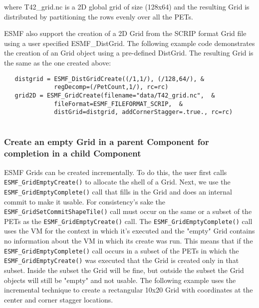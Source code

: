 
    where T42\_grid.nc is a 2D global grid of size (128x64) and the resulting Grid is distributed
    by partitioning the rows evenly over all the PETs. 

    ESMF also support the creation of a 2D Grid from the SCRIP format Grid file using a user specified
    ESMF\_DistGrid.  The following example code demonstrates the creation of an Grid object using a pre-defined
    DistGrid.  The resulting Grid is the same as the one created above: 

 \begin{verbatim}
   distgrid = ESMF_DistGridCreate((/1,1/), (/128,64/), &
              regDecomp=(/PetCount,1/), rc=rc)
   grid2D = ESMF_GridCreate(filename="data/T42_grid.nc",  &
              fileFormat=ESMF_FILEFORMAT_SCRIP,  &
              distGrid=distgrid, addCornerStagger=.true., rc=rc)
 
\end{verbatim}
 

  \subsubsection{Create an empty Grid in a parent Component
   for completion in a child Component}\label{sec:usage:setcommit}
  
   \begin{sloppypar}
   ESMF Grids can be created incrementally. To do this,
   the user first calls {\tt ESMF\_GridEmptyCreate()} to allocate the shell of
   a Grid. Next, we use the {\tt ESMF\_GridEmptyComplete()}
   call that fills in the Grid and does an internal commit to make it usable.
   For consistency's sake the {\tt ESMF\_GridSetCommitShapeTile()}
   call must occur on the same or a subset of the PETs as the
    {\tt ESMF\_GridEmptyCreate()} call. The
   {\tt ESMF\_GridEmptyComplete()} call uses the VM for
   the context in which it's executed and the "empty" Grid contains
   no information about the VM in which its create was run.  This
   means that if the {\tt ESMF\_GridEmptyComplete()} call occurs
   in a subset of the PETs in which the {\tt ESMF\_GridEmptyCreate()} was
   executed that the Grid is created only in that subset. Inside the subset
   the Grid will be fine, but outside the subset the Grid objects will
   still be "empty" and not usable. The following example uses the
   incremental technique to create a rectangular 10x20 Grid with coordinates at
   the center and corner stagger locations.
   \end{sloppypar} 

